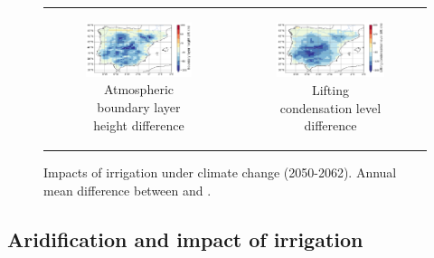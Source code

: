 \begin{figure}[htbp]
\begin{tabular}{cc}
        \begin{subfigure}[b]{0.5\textwidth}
            \caption{Atmospheric boundary layer height difference}
            \includegraphics[width=\textwidth]{images/chap4/future/diffmap_s_pblh_futirr.png}
        \end{subfigure} &
        \begin{subfigure}[b]{0.5\textwidth}
            \caption{Lifting condensation level difference}
            \includegraphics[width=\textwidth]{images/chap4/future/diffmap_s_lcl_futirr.png}
        \end{subfigure} \\
    \end{tabular}
    \caption{Impacts of irrigation under climate change (2050-2062). Annual mean difference between \futirr and \futnoirr.}
    \label{fig:diffmaps_future_irr}
\end{figure}

\clearpage

\subsection{Aridification and impact of irrigation}

